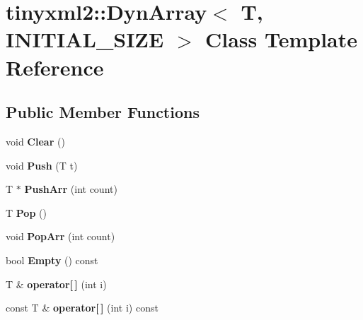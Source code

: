 \hypertarget{classtinyxml2_1_1DynArray}{}\section{tinyxml2\+::Dyn\+Array$<$ T, I\+N\+I\+T\+I\+A\+L\+\_\+\+S\+I\+ZE $>$ Class Template Reference}
\label{classtinyxml2_1_1DynArray}
\subsection*{Public Member Functions}
\begin{DoxyCompactItemize}
\item 
\mbox{\label{classtinyxml2_1_1DynArray_af87a804cd831226d069274b44b74b8bc}} 
void {\bfseries Clear} ()
\item 
\mbox{\label{classtinyxml2_1_1DynArray_aea7ffe983b5d3284bd43171afd7c99d0}} 
void {\bfseries Push} (T t)
\item 
\mbox{\label{classtinyxml2_1_1DynArray_ad289abee8cd02b26e215f1b63d2043f1}} 
T $\ast$ {\bfseries Push\+Arr} (int count)
\item 
\mbox{\label{classtinyxml2_1_1DynArray_a27a3f2f6f869815b6eabb3ea40cf0712}} 
T {\bfseries Pop} ()
\item 
\mbox{\label{classtinyxml2_1_1DynArray_ab8b8c94a2312ab27e2846f0d61ef677a}} 
void {\bfseries Pop\+Arr} (int count)
\item 
\mbox{\label{classtinyxml2_1_1DynArray_a044fc26f44ed3e96ffaeac542188149e}} 
bool {\bfseries Empty} () const
\item 
\mbox{\label{classtinyxml2_1_1DynArray_a756cf4e7464c711aa720e2b17a251daa}} 
T \& {\bfseries operator\mbox{[}$\,$\mbox{]}} (int i)
\item 
\mbox{\label{classtinyxml2_1_1DynArray_a474a5cd9bc97ea32b3dcef4c773125e1}} 
const T \& {\bfseries operator\mbox{[}$\,$\mbox{]}} (int i) const
\item 

\end{DoxyCompactItemize}
